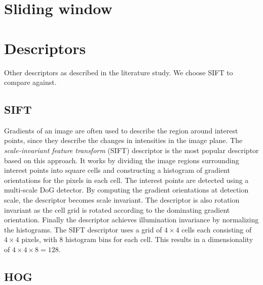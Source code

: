 \documentclass[thesis.tex]{subfiles}
\begin{document}
\section{Sliding window}
\label{sec:slidingWindow}


\section{Descriptors}

Other descriptors as described in the literature study. We choose SIFT to compare against.

\subsection{SIFT}

Gradients of an image are often used to describe the region around interest points, since they describe the changes in intensities in the image plane.
The \emph{scale-invariant feature transform} (SIFT) descriptor
\cite{lowe2004distinctive} is the most popular descriptor based on this
approach. It works by dividing the image regions surrounding interest
points into square cells and constructing a histogram of gradient
orientations for the pixels in each cell. The interest points are detected
using a multi-scale DoG detector. By computing the gradient orientations
at detection scale, the descriptor becomes scale invariant. The descriptor
is also rotation invariant as the cell grid is rotated according to the
dominating gradient orientation. Finally the descriptor achieves illumination
invariance by normalizing the histograms. The SIFT descriptor uses a grid of
$4 \times 4$ cells each consisting of $4 \times 4$ pixels, with 8 histogram
bins for each cell. This results in a dimensionality of $4 \times 4 \times 8 =
128$.


\subsection{HOG}
\end{document}
